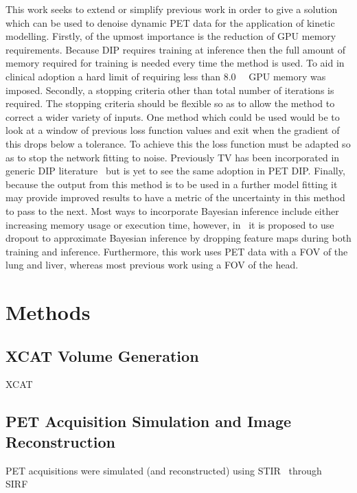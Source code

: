     This work seeks to extend or simplify previous work in order to give a solution which can be used to denoise dynamic \gls{PET} data for the application of kinetic modelling. Firstly, of the upmost importance is the reduction of \gls{GPU} memory requirements. Because \gls{DIP} requires training at inference then the full amount of memory required for training is needed every time the method is used. To aid in clinical adoption a hard limit of requiring less than \SI{8.0}{\giga\byte} \gls{GPU} memory was imposed. Secondly, a stopping criteria other than total number of iterations is required. The stopping criteria should be flexible so as to allow the method to correct a wider variety of inputs. One method which could be used would be to look at a window of previous loss function values and exit when the gradient of this drops below a tolerance. To achieve this the loss function must be adapted so as to stop the network fitting to noise. Previously \gls{TV} has been incorporated in generic \gls{DIP} literature~\cite{Liu2019ImagePrior} but is yet to see the same adoption in \gls{PET} \gls{DIP}. Finally, because the output from this method is to be used in a further model fitting it may provide improved results to have a metric of the uncertainty in this method to pass to the next. Most ways to incorporate Bayesian inference include either increasing memory usage or execution time, however, in~\cite{Gal2015DropoutLearning} it is proposed to use dropout to approximate Bayesian inference by dropping feature maps during both training and inference. Furthermore, this work uses \gls{PET} data with a \gls{FOV} of the lung and liver, whereas most previous work using a \gls{FOV} of the head.


\section{Methods} \label{sec:methods}
    \subsection{XCAT Volume Generation} \label{sec:xcat_volume_generation}
        \gls{XCAT}~\cite{Segars2010}
        
    
    \subsection{PET Acquisition Simulation and Image Reconstruction} \label{sec:pet_acquisition_simulation_and_image_reconstruction}
        \gls{PET} acquisitions were simulated (and reconstructed) using \gls{STIR}~\cite{Thielemans2012, Nikos2019} through \gls{SIRF}~\cite{Ovtchinnikov2017}
        
